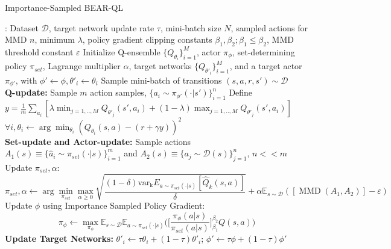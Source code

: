 \begin{algorithm}[H]
\small
\caption{Importance-Sampled BEAR-QL}
\begin{algorithmic}[1]
    \INPUT: Dataset $\mathcal{D}$, target network update rate $\tau$, mini-batch size $N$, sampled actions for MMD $n$, minimum $\lambda$, policy gradient clipping constants $\beta_1, \beta_2; \beta_1 \leq \beta_2$, MMD threshold constant $\varepsilon$
    \STATE Initialize Q-ensemble $\{Q_{\theta_i} \}_{i=1}^{M}$, actor $\pi_{\phi}$, set-determining policy $\pi_{set}$, Lagrange multiplier $\alpha$, target networks $\{ Q_{\theta'_i} \}_{i=1}^M$, and a target actor $\pi_{\phi'}$, with $\phi' \leftarrow \phi, \theta'_i \leftarrow \theta_i$
        \STATE Sample mini-batch of transitions $(s, a, r, s') \sim \mathcal{D}$\\
        \textbf{Q-update:}
            \STATE Sample $m$ action samples, $\{a_i \sim \pi_{\phi'}(\cdot|s')\}_{i=1}^n$
            \STATE Define $y = \frac{1}{m} \sum_{a_i} [ \lambda \min_{j=1,..,M} Q_{\theta'_j}(s', a_i) + (1 - \lambda) \max_{j=1,..,M} Q_{\theta'_j}(s', a_i)]$
            \STATE $\forall i, \theta_i \leftarrow \arg \min_{\theta_i} (Q_{\theta_i}(s, a) - (r + \gamma y))^2$\\
        \textbf{Set-update and Actor-update:}
        \STATE Sample actions $A_1(s) \equiv \{ \hat{a}_i \sim \pi_{set}(\cdot | s) \}_{i=1}^{m}$ and $A_2(s) \equiv \{ a_j \sim \mathcal{D}(s)\}_{j=1}^{n}$, $n << m$
        \STATE Update $\pi_{set}, \alpha$: $$ \pi_{set}, \alpha \leftarrow \arg \min_{\pi_{set}} \max_{\alpha \geq 0} \sqrt{\frac{(1 - \delta) \operatorname{var_k}E_{a \sim \pi_{set}(\cdot |s) }[\hat{Q}_k(s, a)]}{\delta}} + \alpha \mathbb{E}_{s \sim \mathcal{D}} ([\operatorname{MMD}(A_1, A_2)] -  \varepsilon) $$
        \STATE Update $\phi$ using Importance Sampled Policy Gradient: 
        $$ \pi_{\phi} \leftarrow  \max_{\pi_{\phi}} \mathbb{E}_{s \sim \mathcal{D}} \mathbb{E}_{a \sim \pi_{set}(\cdot|s)} \Big( \Big[ \frac{\pi_\phi(a|s)}{\pi_{set}(a|s)} \Big]_{\beta_1}^{\beta_2} Q(s, a) \Big)$$
        \STATE \textbf{Update Target Networks: } $\theta'_i \leftarrow \tau \theta_i + (1 - \tau)\theta'_i$; $\phi' \leftarrow \tau \phi + (1 -\tau) \phi'$ 
    \ENDFOR
\end{algorithmic}
\label{alg:actor_critic}
\end{algorithm}


